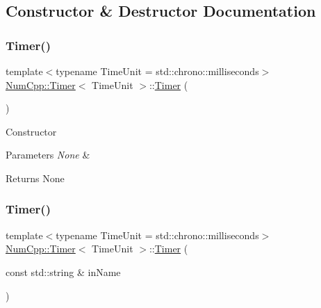 \subsection{Constructor \& Destructor Documentation}
\mbox{\label{class_num_cpp_1_1_timer_a87d3101750d6d321b01bfbbaaae6c1b6}} 
\subsubsection{\texorpdfstring{Timer()}{Timer()}\hspace{0.1cm}{\footnotesize\ttfamily [1/2]}}
{\footnotesize\ttfamily template$<$typename Time\+Unit  = std\+::chrono\+::milliseconds$>$ \\
\mbox{\hyperlink{class_num_cpp_1_1_timer}{Num\+Cpp\+::\+Timer}}$<$ Time\+Unit $>$\+::\mbox{\hyperlink{class_num_cpp_1_1_timer}{Timer}} (\begin{DoxyParamCaption}{ }\end{DoxyParamCaption})\hspace{0.3cm}{\ttfamily [inline]}}

Constructor


\begin{DoxyParams}{Parameters}
{\em None} & \\
\hline
\end{DoxyParams}
\begin{DoxyReturn}{Returns}
None 
\end{DoxyReturn}
\mbox{\label{class_num_cpp_1_1_timer_a36945c44c530ddd72ae0264909dff7d9}} 
\subsubsection{\texorpdfstring{Timer()}{Timer()}\hspace{0.1cm}{\footnotesize\ttfamily [2/2]}}
{\footnotesize\ttfamily template$<$typename Time\+Unit  = std\+::chrono\+::milliseconds$>$ \\
\mbox{\hyperlink{class_num_cpp_1_1_timer}{Num\+Cpp\+::\+Timer}}$<$ Time\+Unit $>$\+::\mbox{\hyperlink{class_num_cpp_1_1_timer}{Timer}} (\begin{DoxyParamCaption}\item[{const std\+::string \&}]{in\+Name }\end{DoxyParamCaption})\hspace{0.3cm}{\ttfamily [inline]}}


